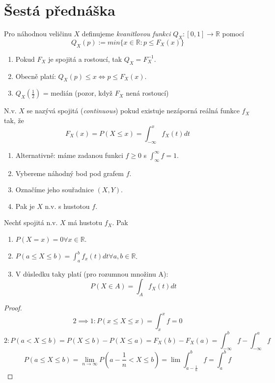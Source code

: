 \documentclass[../main.tex]{subfiles}
\begin{document}
\section{Šestá přednáška}

\begin{definition}
    Pro náhodnou veličinu $X$ definujeme \textit{kvanitlovou funkci} 
    $Q_X : [0,1] \rightarrow \mathbb{R}$ pomocí
    \[Q_X(p) := min \{x \in \mathbb{R} : p \leq F_X(x)\}\]
    \begin{enumerate}
        \item Pokud $F_X$ je spojitá a rostoucí, tak $Q_X = F^{-1}_X.$
        \item Obecně platí: $Q_X(p) \leq x \Leftrightarrow p \leq F_X(x)$.
        \item $Q_X(\frac{1}{2})$ = medián (pozor, když  $F_X$ nená rostoucí)
    \end{enumerate}
\end{definition}

\begin{definition}
    N.v. $X$ se nazývá spojitá (\textit{continuous}) pokud existuje nezáporná reálná funkce $f_X$ tak, že
    \[F_X(x) = P(X \leq x) = \int^x_{-\infty} f_X(t)dt\]
    \begin{enumerate}
        \item Alternativně: máme zadanou funkci $f \geq 0$ s $\int^\infty_\infty f = 1$.
        \item Vybereme náhodný bod pod grafem $f$.
        \item Označíme jeho souřadnice $(X,Y)$.
        \item Pak je $X$ n.v. s hustotou $f$.
    \end{enumerate}
\end{definition}

\begin{theorem}
    Nechť spojitá n.v. $X$ má hustotu $f_X$. Pak
    \begin{enumerate}
        \item $P(X=x) = 0 \forall x \in \mathbb{R}$.
        \item $P(a\leq X \leq b) = \int^b_a f_x(t) dt \forall a,b \in \mathbb{R}$.
        \item V důsledku taky platí (pro rozumnou množinu A):
            \[P(X\in A) = \int_A f_X(t) dt\]
    \end{enumerate} 
\end{theorem}
\begin{proof}
    \[2 \implies 1 : P(x\leq X\leq x) = \int^x_x f = 0\]
    \[2 :  P(a < X \leq b) = P(X\leq b) - P(X\leq a) = F_X(b) - F_X(a) = \int^b_{-\infty} f - \int^a_{-\infty} f\]
    \[P(a\leq X \leq b) = \lim_{n\rightarrow \infty} P(a-\frac{1}{n} < X \leq b) = \lim \int^b_{a-\frac{1}{n}} f = \int^b_a f\]
\end{proof}
\end{document}

